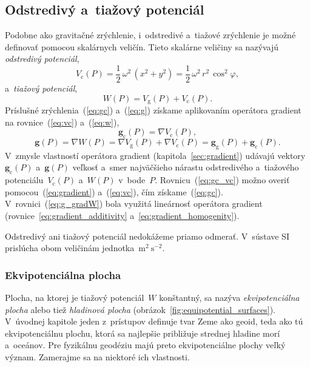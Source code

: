 \documentclass[a4paper, 12pt]{book}
\newcommand{\gidx}{\mathrm g}
\newcommand{\cidx}{\mathrm c}
\let\vec\mathbf
\begin{document}
\subsection{Odstredivý a~tiažový potenciál}
\label{sec:centrifugal_and_gravity_potential}

Podobne ako gravitačné zrýchlenie, i~odstredivé a~tiažové zrýchlenie je
možné definovať pomocou skalárnych veličín.  Tieto skalárne veličiny sa
nazývajú \emph{odstredivý potenciál},
%
\begin{equation}
\label{eq:vc}
V_\cidx(P) = \frac{1}{2} \, \omega^2 \, (x^2 + y^2) = \frac{1}{2} \, \omega^2 
\, r^2 \, \cos^2\varphi{,}
\end{equation}
%
a~\emph{tiažový potenciál},
%
\begin{equation}
\label{eq:w}
W(P) = V_\gidx(P) + V_\cidx(P){.}
\end{equation}
%
Príslušné zrýchlenia~(\ref{eq:gc}) a~(\ref{eq:g}) získame aplikovaním operátora
gradient na rovnice~(\ref{eq:vc}) a~(\ref{eq:w}),
%
\begin{equation}
\label{eq:gc_vc}
\vec g_\cidx(P) = \nabla V_\cidx(P){,}
\end{equation}
%
\begin{equation}
\label{eq:g_gradW}
\vec g(P) = \nabla W(P) = \nabla V_\gidx(P) + \nabla V_\cidx(P) = \vec
g_\gidx(P) + \vec g_\cidx(P){.}
\end{equation}
%
V~zmysle vlastností operátora gradient (kapitola~\ref{sec:gradient}) udávajú 
vektory~$\vec g_\cidx(P)$ a~$\vec g(P)$ veľkosť a~smer najväčšieho nárastu
odstredivého a~tiažového potenciálu~$V_\cidx(P)$ a~$W(P)$ v~bode~$P$.  
Rovnicu~(\ref{eq:gc_vc}) možno overiť pomocou~(\ref{eq:gradient}) 
a~(\ref{eq:vc}), čím získame~(\ref{eq:gc}).  V~rovnici~(\ref{eq:g_gradW}) bola 
využitá lineárnosť operátora gradient (rovnice~\ref{eq:gradient_additivity} 
a~\ref{eq:gradient_homogenity}).

Odstredivý ani tiažový potenciál nedokážeme priamo odmerať.  V~sústave SI 
prislúcha obom veličinám jednotka~$\mathrm{m}^2 \ \mathrm{s}^{-2}$.

\subsubsection{Ekvipotenciálna plocha}
\label{sec:equipotential_surface}

Plocha, na ktorej je tiažový potenciál~$W$ konštantný, sa nazýva 
\emph{ekvipotenciálna plocha} alebo tiež \emph{hladinová plocha} 
(obrázok~\ref{fig:equipotential_surfaces}).  V~úvodnej kapitole jeden 
z~prístupov definuje tvar Zeme ako geoid, teda ako tú ekvipotenciálnu plochu, 
ktorá sa najlepšie približuje strednej hladine morí a~oceánov.  Pre fyzikálnu 
geodéziu majú preto ekvipotenciálne plochy veľký význam.  Zamerajme sa na 
niektoré ich vlastnosti.
\end{document}
